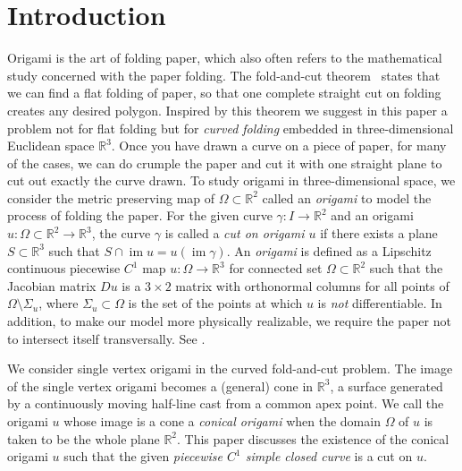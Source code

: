\documentclass{amsart}
\theoremstyle{plain}
\theoremstyle{definition}
\theoremstyle{remark}
\DeclareMathOperator{\im}{im}
\begin{document}
\section{Introduction}%
Origami is the art of folding paper, which also often refers to the mathematical study concerned with the paper folding.
The fold-and-cut theorem~\cite{demaine2000folding} states that we can find a flat folding of paper, 
so that one complete straight cut on folding creates any desired polygon.
Inspired by this theorem we suggest in this paper a problem not for flat folding but for \emph{curved folding} embedded in three-dimensional Euclidean space $\mathbb{R}^3$. %
Once you have drawn a curve on a piece of paper, for many of the cases, we can do crumple the paper and cut it with one straight plane to cut out exactly the curve drawn.
To study origami in three-dimensional space, we consider the metric preserving map of ${\Omega\subset\mathbb R}^2$ called an \emph{origami} to model the process of folding the paper.
For the given curve $\gamma \colon I\to\mathbb{R}^2$ and an origami $u \colon \Omega \subset \mathbb{R}^2\to\mathbb{R}^3$, 
the curve $\gamma$ is called a \emph{cut on origami $u$} if there exists a plane $S\subset\mathbb{R}^3$ such that $S\cap\im u=u(\im\gamma)$.
An \emph{origami} is defined as a Lipschitz continuous piecewise $C^1$ map $u \colon \Omega\to\mathbb{R}^3$ for connected set $\Omega\subset\mathbb{R}^2$ such that 
the Jacobian matrix $Du$ is a $3\times 2$ matrix with orthonormal columns for all points of $\Omega\setminus\Sigma_u$, 
where $\Sigma_u\subset\Omega$ is the set of the points at which $u$ is \emph{not} differentiable. 
In addition, to make our model more physically realizable, we require the paper not to intersect itself transversally.
See \cite{dacorogna2008lipschitz}.

We consider single vertex origami in the curved fold-and-cut problem.
The image of the single vertex origami becomes a (general) cone in $\mathbb{R}^3$, 
a surface generated by a continuously moving half-line cast from a common apex point.
We call the origami $u$ whose image is a cone a \emph{conical origami} when the domain $\Omega$ of $u$ is taken to be the whole plane $\mathbb{R}^2$. %
This paper discusses the existence of the conical origami $u$ such that the given \emph{piecewise $C^1$ simple closed curve} is a cut on $u$.
\end{document}
